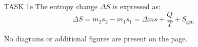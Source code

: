 TASK 1e  
The entropy change \( \Delta S \) is expressed as:  
\[
\Delta S = m_2 s_2 - m_1 s_1 = \Delta m s + \frac{Q}{T} + S_{\text{gen}}
\]  

No diagrams or additional figures are present on the page.